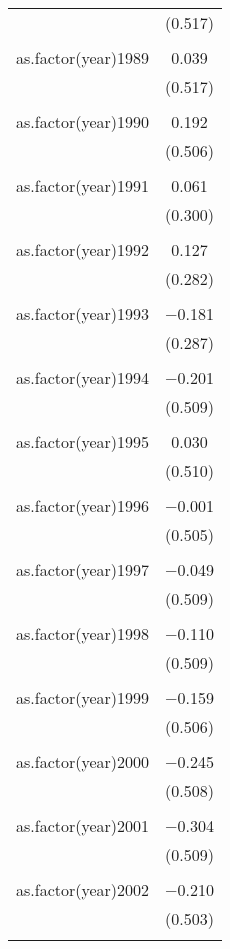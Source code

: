 \documentclass[12pt,letterpaper]{article}
\begin{document}
\begin{table}[!htbp]
\begin{tabular}{@{\extracolsep{5pt}}lc}
		& (0.517) \\ 
		& \\ 
		as.factor(year)1989 & 0.039 \\ 
		& (0.517) \\ 
		& \\ 
		as.factor(year)1990 & 0.192 \\ 
		& (0.506) \\ 
		& \\ 
		as.factor(year)1991 & 0.061 \\ 
		& (0.300) \\ 
		& \\ 
		as.factor(year)1992 & 0.127 \\ 
		& (0.282) \\ 
		& \\ 
		as.factor(year)1993 & $-$0.181 \\ 
		& (0.287) \\ 
		& \\ 
		as.factor(year)1994 & $-$0.201 \\ 
		& (0.509) \\ 
		& \\ 
		as.factor(year)1995 & 0.030 \\ 
		& (0.510) \\ 
		& \\ 
		as.factor(year)1996 & $-$0.001 \\ 
		& (0.505) \\ 
		& \\ 
		as.factor(year)1997 & $-$0.049 \\ 
		& (0.509) \\ 
		& \\ 
		as.factor(year)1998 & $-$0.110 \\ 
		& (0.509) \\ 
		& \\ 
		as.factor(year)1999 & $-$0.159 \\ 
		& (0.506) \\ 
		& \\ 
		as.factor(year)2000 & $-$0.245 \\ 
		& (0.508) \\ 
		& \\ 
		as.factor(year)2001 & $-$0.304 \\ 
		& (0.509) \\ 
		& \\ 
		as.factor(year)2002 & $-$0.210 \\ 
		& (0.503) \\ 
		& \\ 

\end{tabular}
\end{table}
\end{document}

